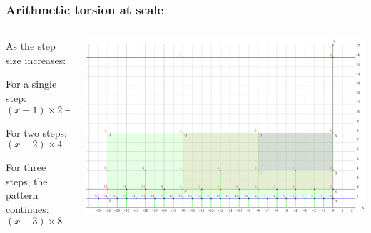 \documentclass[aspectratio=169]{beamer}
\begin{document}
\begin{frame}
    \frametitle{Arithmetic torsion at scale}
    \begin{columns}
        \begin{column}{0.5\textwidth}
            As the step size increases:

            For a single step:
            \begin{equation}
            (x + 1) \times 2 - (x \times 2 + 1) = 1
            \end{equation}

            For two steps:
            \begin{equation}
            (x + 2) \times 4 - (x \times 4 + 2) = 6
            \end{equation}

            For three steps, the pattern continues:
            \begin{equation}
            (x + 3) \times 8 - (x \times 8 + 3) = 21
            \end{equation}
        \end{column}
        \begin{column}{0.5\textwidth}
            \begin{center}
                \includegraphics[width=1.0\textwidth]{../images/17-area-formula}
            \end{center}
        \end{column}
    \end{columns}
\end{frame}
\end{document}
